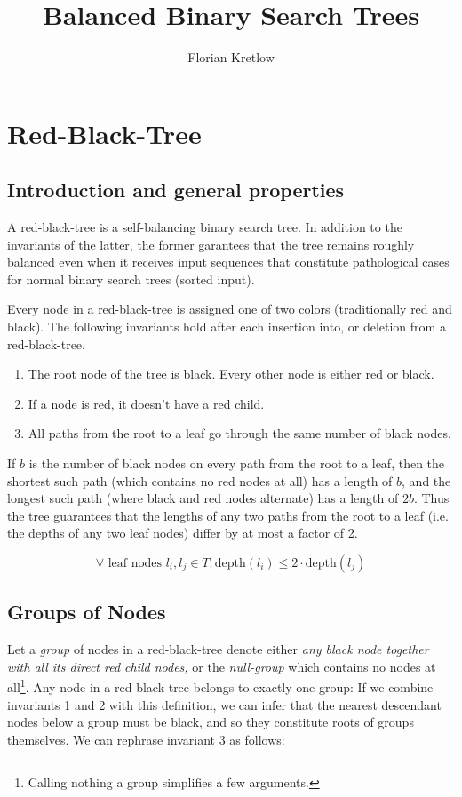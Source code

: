 \documentclass{article}
\title{Balanced Binary Search Trees}
\author{Florian Kretlow}
\begin{document}
\section{Red-Black-Tree}

\subsection{Introduction and general properties}
A red-black-tree is a self-balancing binary search tree. In addition to the invariants
of the latter, the former garantees that the tree remains roughly balanced even when it
receives input sequences that constitute pathological cases for normal binary search
trees (sorted input).

Every node in a red-black-tree is assigned one of two colors (traditionally red and
black). The following invariants hold after each insertion into, or deletion from a
red-black-tree.

\begin{enumerate}[label=(\arabic*)]
\item The root node of the tree is black. Every other node is either red or black.
\item If a node is red, it doesn't have a red child.
\item All paths from the root to a leaf go through the same number of black nodes.
\end{enumerate}

If \(b\) is the number of black nodes on every path from the root to a leaf, then
the shortest such path (which contains no red nodes at all) has a length of \(b\), and
the longest such path (where black and red nodes alternate) has a length of
\(2b\). Thus the tree guarantees that the lengths of any two
paths from the root to a leaf (i.e. the depths of any two leaf nodes) differ by at most
a factor of 2.

\[
\forall \text{ leaf nodes } l_{i}, l_{j} \in T : \text{depth}(l_i) \leq 2 \cdot
\text{depth}(l_j)
\]

\subsection{Groups of Nodes}
Let a \emph{group} of nodes in a red-black-tree denote either \emph{any black node
together with all its direct red child nodes,} or the \emph{null-group} which contains
no nodes at all\footnote{Calling nothing a group simplifies a few arguments.}.  Any node
in a red-black-tree belongs to exactly one group: If we combine invariants 1 and 2 with
this definition, we can infer that the nearest descendant nodes below a group must be
black, and so they constitute roots of groups themselves.  We can rephrase invariant 3
as follows:
\end{document}
